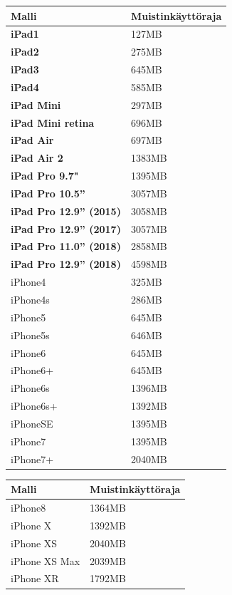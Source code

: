 \documentclass[utf8]{gradu3}
\begin{document}
\begin{center}
    \begin{tabular}{| l | l |}
    \hline
    \textbf{Malli} & \textbf{Muistinkäyttöraja} \\ \hline
    \textbf{iPad1} & 127MB  \\ \hline
    \textbf{iPad2} & 275MB \\ \hline
    \textbf{iPad3} & 645MB \\ \hline
    \textbf{iPad4} & 585MB \\ \hline
    \textbf{iPad Mini} & 297MB \\ \hline
    \textbf{iPad Mini retina} & 696MB \\ \hline
    \textbf{iPad Air} & 697MB \\ \hline
    \textbf{iPad Air 2} & 1383MB \\ \hline
    \textbf{iPad Pro 9.7"} & 1395MB  \\ \hline
    \textbf{iPad Pro 10.5”} & 3057MB \\ \hline
    \textbf{iPad Pro 12.9” (2015)} & 3058MB \\ \hline
    \textbf{iPad Pro 12.9” (2017)} & 3057MB \\ \hline
    \textbf{iPad Pro 11.0” (2018)} & 2858MB \\ \hline
    \textbf{iPad Pro 12.9” (2018)} & 4598MB \\ \hline
    iPhone4 & 325MB \\ \hline
    iPhone4s & 286MB \\ \hline
    iPhone5 & 645MB \\ \hline
    iPhone5s & 646MB \\ \hline
    iPhone6 & 645MB \\ \hline
    iPhone6+ & 645MB \\ \hline
    iPhone6s & 1396MB \\ \hline
    iPhone6s+ & 1392MB \\ \hline
    iPhoneSE & 1395MB \\ \hline
    iPhone7 & 1395MB \\ \hline
    iPhone7+ & 2040MB \\ \hline
    \end{tabular}
\end{center}

\begin{center}
    \begin{tabular}{| l | l |}
    \hline
    \textbf{Malli} & \textbf{Muistinkäyttöraja} \\ \hline
    iPhone8 & 1364MB \\ \hline 
    iPhone X & 1392MB \\ \hline
    iPhone XS & 2040MB \\ \hline
    iPhone XS Max & 2039MB \\ \hline
    iPhone XR & 1792MB \\ \hline   
    \end{tabular}
\end{center}
\end{document}
